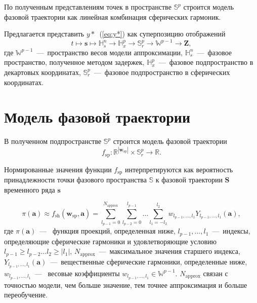 \documentclass[12pt,twoside]{article}
\begin{document}
По полученным представлениям точек в пространстве $\mathbb{S}^{p}$ строится модель фазовой траектории как линейная комбинация сферических гармоник.

Предлагается представить $y*$~(\ref{eq:y*}) как суперпозицию отображений
\begin{equation*}
t \mapsto \mathbf{s} \mapsto \mathbb{H}_{s}^{n} \xrightarrow{} \mathbb{H}_{x}^{p} \xrightarrow{} \mathbb{S}_r^{p} \xrightarrow{} \mathbb{W}^{p-1} \xrightarrow{} \mathbf{Z},
\label{tikhonov_eq_pipeline}
\end{equation*}
где $\mathbb{W}^{p-1}$~---~пространство весов модели аппроксимации, $\mathbb{H}_{s}^{n}$~---~фазовое пространство, полученное методом задержек, $\mathbb{H}_{x}^{p}$~---~фазовое подпространство в декартовых координатах, $\mathbb{S}_{r}^{p}$~---~фазовое подпространство в сферических координатах.
\section{Модель фазовой траектории}
В полученном подпространстве $\mathbb{S}^{p}$ строится модель фазовой траектории
\begin{equation}
    f_{\text{sp}}: \mathbb{R}^{|\mathbf{w}_{\text{sp}}|} \times \mathbb{S}_{r}^{p}
    \xrightarrow{}
    \mathbb{R}.
\label{eq:f_sp}
\end{equation}

Нормированные значения функции $f_{\text{sp}}$ интерпретируются как вероятность принадлежности точки фазового пространства $\mathbb{S}$ к фазовой траектории $\mathbf{S}$ временного ряда $\mathbf{s}$

\begin{equation}
	\pi(\mathbf{a}) \approx
	f_{\text{sh}}(\mathbf{w}_{\text{sp}},\mathbf{a}) =
	\sum_{l_{p-1} = 0}^{N_{\text{approx}}}
	\sum_{l_{p-2} = 0}^{l_{p-1}}
	\dots
	\sum_{l_1 = -l_2}^{l_2}
	w_{l_{p-1},...,l_1} Y_{l_{p-1},...,l_1}(\mathbf{a}),
\label{eq:f_sh}
\end{equation}
где $\pi(\mathbf{a})$~---~ функция проекций, определенная ниже, $l_{p-1},...,l_1$~---~индексы, определяющие сферические гармоники и удовлетворяющие условию $l_{p-1} \geq l_{p-2} \dots l_2 \geq|l_1|$, $N_{\text{approx}}$~---~максимальное значения старшего индекса, $Y_{l_{p-1},...,l_1}(\mathbf{a})$~---~вещественные сферические гармоники, определенные ниже, $w_{l_{p-1},...,l_1}$~---~ весовые коэффициенты $w_{l_{p-1},...,l_1} \in \mathbb{W}^{p-1}$.
$N_{\text{approx}}$ связан с точностью модели, чем больше значение, тем точнее аппроксимация и больше переобучение. 
 
\end{document}
